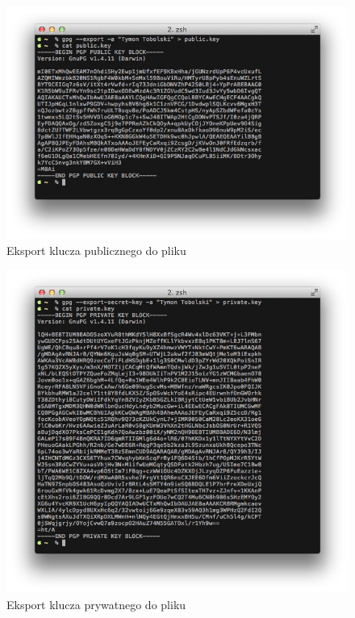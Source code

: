 \documentclass[wide,a4paper,titlepage,12pt] {article}
\begin{document}
  \begin{figure}[h!]
    \begin{center}
      \includegraphics[width=\textwidth]{img/6.png}
      \caption{Eksport klucza publicznego do pliku}
    \end{center}
  \end{figure}

  \begin{figure}[h!]
    \begin{center}
      \includegraphics[width=\textwidth]{img/7.png}
      \caption{Eksport klucza prywatnego do pliku}
    \end{center}
  \end{figure}
\end{document}
